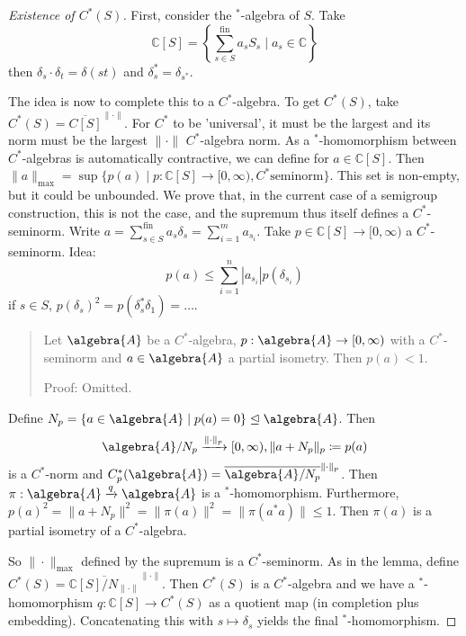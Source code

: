 \documentclass[a4paper]{article}
\begin{document}
\begin{proof}[Existence of $C^*(S)$]
	First, consider the $^*$-algebra of $S$.
	Take
	\begin{equation*}
		\mathds{C}[S] = \left\{ \sum_{s \in S}^\mathrm{fin} a_s S_s \mid a_s \in \mathds{C}\right\}
	\end{equation*}
	then $\delta_s \cdot \delta_t = \delta(st)$ and $\delta_s^* = \delta_{s^*} $.

	The idea is now to complete this to a $C^*$-algebra. To get $C^*(S)$, take $C^*(S) = \overline{C[S]}^{\|\cdot\|}$.
	For $C^*$ to be 'universal', it must be the largest and its norm must be the largest $\|\cdot\|$ $C^*$-algebra norm.
	As a $^*$-homomorphism between $C^*$-algebras is automatically contractive, we can define for $a \in \mathds{C}[S]$.
	Then $\|a\|_{\max} = \sup \{ p(a) \mid p: \mathds{C}[S] \to [0, \infty), C^*\text{seminorm} \}$.
	This set is non-empty, but it could be unbounded.
	We prove that, in the current case of a semigroup construction, this is not the case, and the supremum thus itself defines a $C^*$-seminorm.
	Write $a = \sum_{s \in S}^\mathrm{fin} a_s \delta_s = \sum_{i = 1}^{m} a_{s_i}$.
	Take $p \in \mathds{C}[S] \to [0, \infty)$ a $C^*$-seminorm.
	Idea: 
	\begin{equation*}
		p(a) \leq \sum_{i=1}^n |a_{s_i}| p(\delta_{s_i})
	\end{equation*}
	if $s \in S$, $p(\delta_s)^2 = p(\delta_s^* \delta_1) =\dots$.
	
	\begin{quote}
		Let $\algebra{A}$ be a $C^*$-algebra, $p: \algebra{A} \to [0, \infty )$ with a $C^*$-seminorm and $a \in \algebra{A}$ a partial isometry.
		Then $p(a) < 1$.

		Proof: Omitted.
	\end{quote}
	
	Define $N_p = \{a \in \algebra{A} \mid p(a) = 0\} \trianglelefteq \algebra{A}$. 
	Then 
	\begin{equation*}
		\algebra{A}/N_p \xrightarrow{\|\cdot \|_p} [0, \infty), \|a + N_p\|_p \coloneq p(a)
	\end{equation*}
	is a $C^*$-norm and $C_p^*(\algebra{A}) = \overline{\algebra{A} / N_p}^{\|\cdot\|_p}$.
	Then $\pi: \algebra{A} \xrightarrow{q} \algebra{A}$ is a $^*$-homomorphism.
	Furthermore, $p(a)^2 = \|a + N_p\|^2 = \|\pi(a)\|^2 = \|\pi(a^*a)\| \leq 1$.
	Then $\pi(a)$ is a partial isometry of a $C^*$-algebra.

	So $\|\cdot\|_{\max}$ defined by the supremum is a $C^*$-seminorm.
	As in the lemma, define $C^*(S) = \overline{\mathds{C}[S] / N_{\|\cdot\|}}^{\|\cdot\|}$.
	Then $C^*(S)$ is a $C^*$-algebra and we have a $^*$-homomorphism $q: \mathds{C}[S] \to C^*(S)$ as a quotient map (in completion plus embedding).
	Concatenating this with $s \mapsto \delta_s$ yields the final $^*$-homomorphism.


\end{proof}
\end{document}
